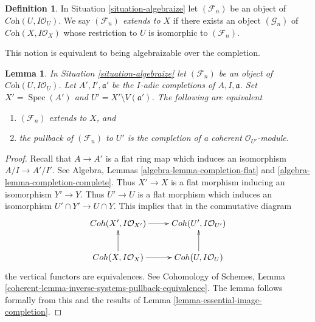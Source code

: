 \documentclass{stacks-project}
\theoremstyle{plain}
\newtheorem{lemma}[subsection]{Lemma}
\theoremstyle{definition}
\newtheorem{definition}[subsection]{Definition}
\theoremstyle{remark}
\numberwithin{equation}{subsection}
\def\Spec{\mathop{\mathrm{Spec}}}
\begin{document}
\begin{definition}
\label{definition-algebraizable}
In Situation \ref{situation-algebraize} let $(\mathcal{F}_n)$ be an
object of $\textit{Coh}(U, I\mathcal{O}_U)$. We say
{\it $(\mathcal{F}_n)$ extends to $X$} if there exists an object
$(\mathcal{G}_n)$ of $\textit{Coh}(X, I\mathcal{O}_X)$ whose restriction
to $U$ is isomorphic to $(\mathcal{F}_n)$.
\end{definition}

\noindent
This notion is equivalent to being algebraizable over the completion.

\begin{lemma}
\label{lemma-algebraizable}
In Situation \ref{situation-algebraize} let $(\mathcal{F}_n)$ be an
object of $\textit{Coh}(U, I\mathcal{O}_U)$. Let $A', I', \mathfrak a'$
be the $I$-adic completions of $A, I, \mathfrak a$. Set $X' = \Spec(A')$
and $U' = X' \setminus V(\mathfrak a')$. The following are equivalent
\begin{enumerate}
\item $(\mathcal{F}_n)$ extends to $X$, and
\item the pullback of $(\mathcal{F}_n)$ to $U'$ is the completion
of a coherent $\mathcal{O}_{U'}$-module.
\end{enumerate}
\end{lemma}

\begin{proof}
Recall that $A \to A'$ is a flat ring map which induces an isomorphism
$A/I \to A'/I'$. See
Algebra, Lemmas \ref{algebra-lemma-completion-flat} and
\ref{algebra-lemma-completion-complete}.
Thus $X' \to X$ is a
flat morphism inducing an isomorphism $Y' \to Y$. Thus $U' \to U$
is a flat morphism which induces an isomorphism $U' \cap Y' \to U \cap Y$.
This implies that in the commutative diagram
$$
\xymatrix{
\textit{Coh}(X', I\mathcal{O}_{X'}) \ar[r] &
\textit{Coh}(U', I\mathcal{O}_{U'}) \\
\textit{Coh}(X, I\mathcal{O}_X) \ar[u] \ar[r] &
\textit{Coh}(U, I\mathcal{O}_U) \ar[u]
}
$$
the vertical functors are equivalences. See
Cohomology of Schemes, Lemma
\ref{coherent-lemma-inverse-systems-pullback-equivalence}.
The lemma follows formally from this and the results of
Lemma \ref{lemma-essential-image-completion}.
\end{proof}
\end{document}
